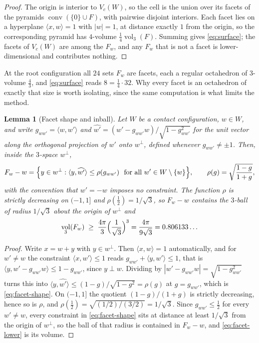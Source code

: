 \documentclass[11pt,reqno]{amsart}
\renewcommand{\_}{\origunderscore\allowbreak}
\numberwithin{equation}{section}
\theoremstyle{plain}
\newtheorem{lem}[thm]{Lemma}
\theoremstyle{definition}
\theoremstyle{remark}
\DeclareMathOperator{\vol}{vol}
\DeclareMathOperator{\conv}{conv}
\begin{document}
\begin{proof}
The origin is interior to $V_c(W)$, so the cell is the union over its
facets of the pyramids $\conv(\{0\}\cup F)$, with pairwise disjoint
interiors. Each facet lies on a hyperplane $\langle x,w\rangle=1$ with
$|w|=1$, at distance exactly $1$ from the origin, so the corresponding
pyramid has $4$-volume $\tfrac14\vol_3(F)$. Summing gives
\eqref{eq:surface}; the facets of $V_c(W)$ are among the $F_w$, and any
$F_w$ that is not a facet is lower-dimensional and contributes nothing.
\end{proof}

At the root configuration all $24$ sets $F_w$ are facets, each a regular
octahedron of $3$-volume $\tfrac43$, and \eqref{eq:surface} reads
$8=\tfrac14\cdot32$. Why every facet is an octahedron of exactly that
size is worth isolating, since the same computation is what limits the
method.

\begin{lem}[Facet shape and inball]\label{lem:facet-inball}
Let $W$ be a contact configuration, $w\in W$, and write
$g_{w w'}=\langle w,w'\rangle$ and
$\widehat{w'}=(w'-g_{ww'}w)/\sqrt{1-g_{ww'}^2}$ for the unit vector
along the orthogonal projection of $w'$ onto $w^{\perp}$, defined
whenever $g_{ww'}\ne\pm1$. Then, inside the $3$-space $w^{\perp}$,
\begin{equation}\label{eq:facet-shape}
  F_w-w=\Bigl\{y\in w^{\perp}:\langle y,\widehat{w'}\rangle
  \le\rho(g_{ww'})\ \text{ for all }w'\in W\setminus\{w\}\Bigr\},
  \qquad
  \rho(g)=\sqrt{\frac{1-g}{1+g}},
\end{equation}
with the convention that $w'=-w$ imposes no constraint. The function
$\rho$ is strictly decreasing on $(-1,1]$ and $\rho(\tfrac12)=1/\sqrt3$,
so $F_w-w$ contains the $3$-ball of radius $1/\sqrt3$ about the origin
of $w^{\perp}$ and
\begin{equation}\label{eq:facet-lower}
  \vol_3(F_w)\;\ge\;\frac{4\pi}{3}\Bigl(\frac{1}{\sqrt3}\Bigr)^{3}
  =\frac{4\pi}{9\sqrt3}=0.806133\ldots
\end{equation}
\end{lem}

\begin{proof}
Write $x=w+y$ with $y\in w^{\perp}$. Then $\langle x,w\rangle=1$
automatically, and for $w'\ne w$ the constraint $\langle
x,w'\rangle\le1$ reads $g_{ww'}+\langle y,w'\rangle\le1$, that is
$\langle y,w'-g_{ww'}w\rangle\le1-g_{ww'}$, since $y\perp w$. Dividing
by $|w'-g_{ww'}w|=\sqrt{1-g_{ww'}^2}$ turns this into
$\langle y,\widehat{w'}\rangle\le(1-g)/\sqrt{1-g^{2}}=\rho(g)$ at
$g=g_{ww'}$, which is \eqref{eq:facet-shape}. On $(-1,1]$ the quotient
$(1-g)/(1+g)$ is strictly decreasing, hence so is $\rho$, and
$\rho(\tfrac12)=\sqrt{(1/2)/(3/2)}=1/\sqrt3$. Since $g_{ww'}\le\tfrac12$
for every $w'\ne w$, every constraint in \eqref{eq:facet-shape} sits at
distance at least $1/\sqrt3$ from the origin of $w^{\perp}$, so the ball
of that radius is contained in $F_w-w$, and \eqref{eq:facet-lower} is
its volume.
\end{proof}
\end{document}
